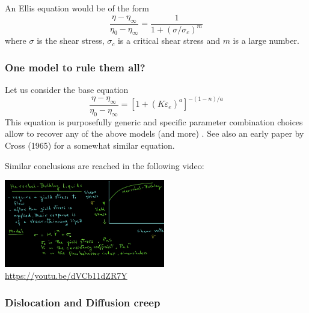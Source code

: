 An Ellis equation would be of the form \cite{robc01} 
\begin{equation}
\frac{\eta-\eta_\infty}{\eta_0-\eta_\infty} =
\frac{1}{1+(\sigma/\sigma_c)^m}
\end{equation}
where $\sigma$ is the shear stress, $\sigma_c$ is a critical shear stress
and $m$ is a large number. 

\subsubsection{One model to rule them all? \label{ss:cross}}

Let us consider the base equation
\begin{equation}
\boxed{
\frac{\eta-\eta_\infty}{\eta_0-\eta_\infty} = 
\left[ 1+(K \dot{\varepsilon}_e)^a  \right]^{-(1-n)/a}
}
\end{equation}
This equation is purposefully generic and specific parameter combination choices 
allow to recover any of the above models (and more) \cite{osru14}.
See also an early paper by Cross (1965) \cite{cros65} for a somewhat similar equation. 

Similar conclusions are reached in the following video:
\begin{center}
\includegraphics[width=7cm]{images/rheology/hbyoutube}\\
{\captionfont \url{https://youtu.be/dVCb11dZR7Y}}
\end{center}

\subsubsection{Dislocation and Diffusion creep}

